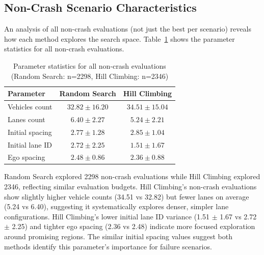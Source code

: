 \documentclass[11pt,a4paper]{article}
\begin{document}
\subsection{Non-Crash Scenario Characteristics}

An analysis of all non-crash evaluations (not just the best per scenario) reveals how each method explores the search space. Table~\ref{tab:noncrash_params} shows the parameter statistics for all non-crash evaluations.

\begin{table}[H]
\centering
\begin{tabular}{lcc}
\toprule
\textbf{Parameter} & \textbf{Random Search} & \textbf{Hill Climbing} \\
\midrule
Vehicles count & $32.82 \pm 16.20$ & $34.51 \pm 15.04$ \\
Lanes count & $6.40 \pm 2.27$ & $5.24 \pm 2.21$ \\
Initial spacing & $2.77 \pm 1.28$ & $2.85 \pm 1.04$ \\
Initial lane ID & $2.72 \pm 2.25$ & $1.51 \pm 1.67$ \\
Ego spacing & $2.48 \pm 0.86$ & $2.36 \pm 0.88$ \\
\bottomrule
\end{tabular}
\caption{Parameter statistics for all non-crash evaluations (Random Search: n=2298, Hill Climbing: n=2346)}
\label{tab:noncrash_params}
\end{table}

Random Search explored 2298 non-crash evaluations while Hill Climbing explored 2346, reflecting similar evaluation budgets. Hill Climbing's non-crash evaluations show slightly higher vehicle counts (34.51 vs 32.82) but fewer lanes on average (5.24 vs 6.40), suggesting it systematically explores denser, simpler lane configurations. Hill Climbing's lower initial lane ID variance (1.51 $\pm$ 1.67 vs 2.72 $\pm$ 2.25) and tighter ego spacing (2.36 vs 2.48) indicate more focused exploration around promising regions. The similar initial spacing values suggest both methods identify this parameter's importance for failure scenarios.
\end{document}
